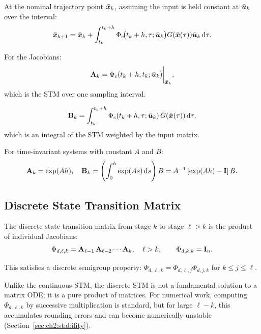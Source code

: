 At the nominal trajectory point $\bar{\bm{x}}_k$, assuming the input is held constant at $\bar{\bm{u}}_k$ over the interval:
\begin{equation}
\bar{\bm{x}}_{k+1} = \bar{\bm{x}}_k + \int_{t_k}^{t_k+h}\Phi_c\!\bigl(t_k+h,\tau;\bar{\bm{u}}_k\bigr)G(\bar{\bm{x}}(\tau))\bar{\bm{u}}_k\,\mathrm{d}\tau.
\end{equation}

For the Jacobians:
\begin{equation}
\mathbf{A}_k = \Phi_c(t_k+h,t_k;\bar{\bm{u}}_k)\bigg|_{\bar{\bm{x}}_k},
\label{eq:ch2:Ak-stm}
\end{equation}
which is the STM over one sampling interval.

\begin{equation}
\mathbf{B}_k = \int_{t_k}^{t_k+h}\Phi_c(t_k+h,\tau;\bar{\bm{u}}_k)\,G(\bar{\bm{x}}(\tau))\,\mathrm{d}\tau,
\label{eq:ch2:Bk-integral}
\end{equation}
which is an integral of the STM weighted by the input matrix.

For time-invariant systems with constant $A$ and $B$:
\begin{equation}
\mathbf{A}_k = \exp(A h), \quad \mathbf{B}_k = \left(\int_0^h \exp(A s)\,\mathrm{d} s\right)B = A^{-1}\left[\exp(Ah)-\mathbf{I}\right]B.
\label{eq:ch2:AB-discrete-formula}
\end{equation}

\subsection{Discrete State Transition Matrix}

The discrete state transition matrix from stage $k$ to stage $\ell > k$ is the product of individual Jacobians:
\begin{equation}
\Phi_{d,\ell,k} = \mathbf{A}_{\ell-1}\,\mathbf{A}_{\ell-2}\cdots\mathbf{A}_k,
\quad \ell > k,
\qquad
\Phi_{d,k,k} = \mathbf{I}_n.
\label{eq:ch2:discrete-stm}
\end{equation}

This satisfies a discrete semigroup property: $\Phi_{d,\ell,k} = \Phi_{d,\ell,j}\Phi_{d,j,k}$ for $k \leq j \leq \ell$.

\begin{remark}
Unlike the continuous STM, the discrete STM is not a fundamental solution to a matrix ODE;
it is a pure product of matrices. For numerical work, computing $\Phi_{d,\ell,k}$ by successive
multiplication is standard, but for large $\ell-k$, this accumulates rounding errors and can
become numerically unstable (Section~\ref{sec:ch2:stability}).
\end{remark}


